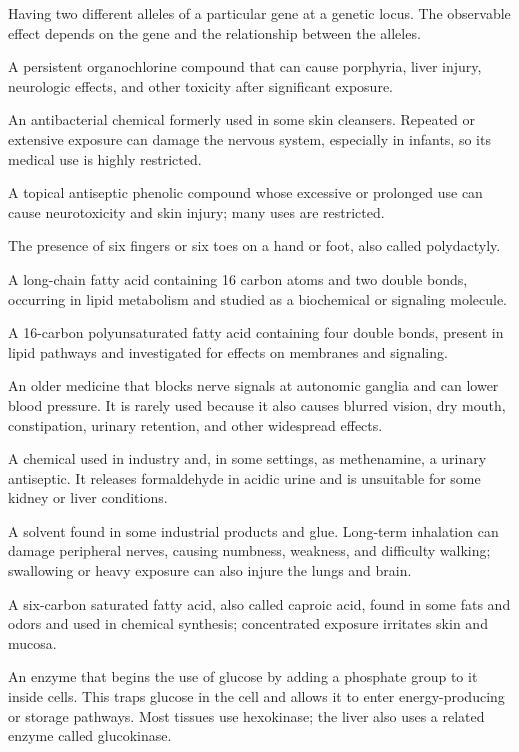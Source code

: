  Having two different alleles of a particular gene at a genetic locus. The observable effect depends on the gene and the relationship between the alleles.

 A persistent organochlorine compound that can cause porphyria, liver injury, neurologic effects, and other toxicity after significant exposure.

 An antibacterial chemical formerly used in some skin cleansers. Repeated or extensive exposure can damage the nervous system, especially in infants, so its medical use is highly restricted.

 A topical antiseptic phenolic compound whose excessive or prolonged use can cause neurotoxicity and skin injury; many uses are restricted.

 The presence of six fingers or six toes on a hand or foot, also called polydactyly.

 A long-chain fatty acid containing 16 carbon atoms and two double bonds, occurring in lipid metabolism and studied as a biochemical or signaling molecule.

 A 16-carbon polyunsaturated fatty acid containing four double bonds, present in lipid pathways and investigated for effects on membranes and signaling.

 An older medicine that blocks nerve signals at autonomic ganglia and can lower blood pressure. It is rarely used because it also causes blurred vision, dry mouth, constipation, urinary retention, and other widespread effects.

 A chemical used in industry and, in some settings, as methenamine, a urinary antiseptic. It releases formaldehyde in acidic urine and is unsuitable for some kidney or liver conditions.

 A solvent found in some industrial products and glue. Long-term inhalation can damage peripheral nerves, causing numbness, weakness, and difficulty walking; swallowing or heavy exposure can also injure the lungs and brain.

 A six-carbon saturated fatty acid, also called caproic acid, found in some fats and odors and used in chemical synthesis; concentrated exposure irritates skin and mucosa.

 An enzyme that begins the use of glucose by adding a phosphate group to it inside cells. This traps glucose in the cell and allows it to enter energy-producing or storage pathways. Most tissues use hexokinase; the liver also uses a related enzyme called glucokinase.

